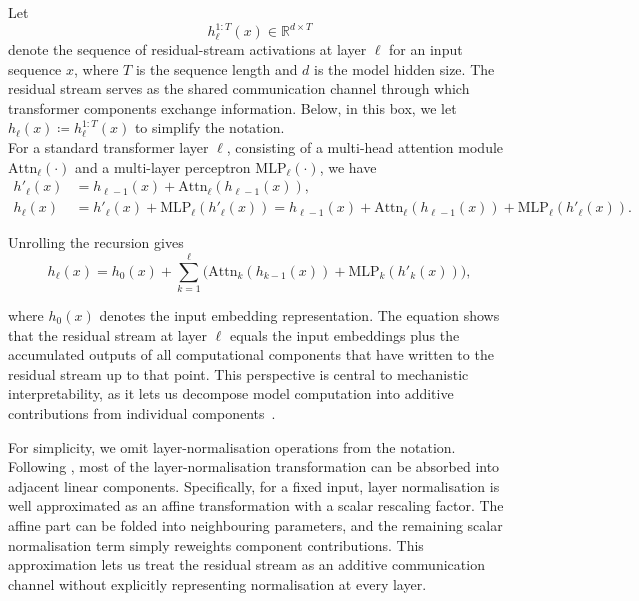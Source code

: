\begin{definitionbox}
Let
\[
h^{1:T}_\ell(x) \in \mathbb{R}^{d \times T}
\]
denote the sequence of residual-stream activations at layer $\ell$ for an input
sequence $x$, where $T$ is the sequence length and $d$ is the model hidden size.
The residual stream serves as the shared communication channel through which
transformer components exchange information. Below, in this box, we let $h_\ell(x) \coloneqq h^{1:T}_\ell(x)$ to simplify the notation.\\

For a standard transformer layer $\ell$, consisting of a multi-head attention module $\mathrm{Attn}_\ell(\cdot)$ and a multi-layer perceptron $\mathrm{MLP}_\ell(\cdot)$, we have
\begin{align*}
h'_\ell(x)
    &= h_{\ell-1}(x)
       + \mathrm{Attn}_\ell(h_{\ell-1}(x)), \\
h_\ell(x)
    &= h'_\ell(x)
       + \mathrm{MLP}_\ell(h'_\ell(x))
    = h_{\ell-1}(x)
       + \mathrm{Attn}_\ell(h_{\ell-1}(x)) + \mathrm{MLP}_\ell(h'_\ell(x)).
\end{align*}

Unrolling the recursion gives
\[
h_\ell(x)
=
h_0(x)
+
\sum_{k=1}^{\ell}
\Big(
\mathrm{Attn}_k(h_{k-1}(x))
+
\mathrm{MLP}_k(h'_k(x))
\Big),
\]

where \(h_0(x)\) denotes the input embedding representation. The equation shows that the residual stream at layer \(\ell\) equals the input embeddings plus the accumulated outputs of all computational components that have written to the residual stream up to that point. This perspective is central to mechanistic interpretability, as it lets us decompose model computation into additive contributions from individual components~.

\end{definitionbox}







For simplicity, we omit layer-normalisation operations from the notation. Following , most of the layer-normalisation transformation can be absorbed into adjacent linear components. Specifically, for a fixed input, layer normalisation is well approximated as an affine transformation with a scalar rescaling factor. The affine part can be folded into neighbouring parameters, and the remaining scalar normalisation term simply reweights component contributions. This approximation lets us treat the residual stream as an additive communication channel without explicitly representing normalisation at every layer.

